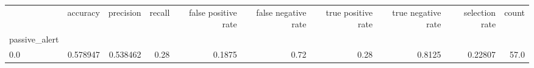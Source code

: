 \begin{tabular}{lrrrrrrrrr}
\toprule
{} &  accuracy &  precision &  recall &  false positive rate &  false negative rate &  true positive rate &  true negative rate &  selection rate &  count \\
passive\_alert &           &            &         &                      &                      &                     &                     &                 &        \\
\midrule
0.0           &  0.578947 &   0.538462 &    0.28 &               0.1875 &                 0.72 &                0.28 &              0.8125 &         0.22807 &   57.0 \\
\bottomrule
\end{tabular}
